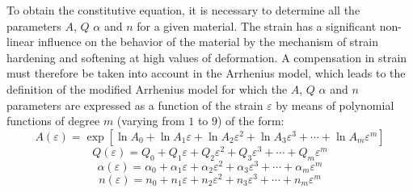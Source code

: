 \documentclass[twoside,english,1p,final,sort&compress]{elsarticle}
\theoremstyle{plain}
\begin{document}
To obtain the constitutive equation, it is necessary to determine all the parameters $A$, $Q$ $\alpha$ and $n$ for a given material.
The strain has a significant non-linear influence on the behavior of the material by the mechanism of strain hardening and softening at high values of deformation.
A compensation in strain must therefore be taken into account in the Arrhenius model, which leads to the definition of the modified Arrhenius model for which the $A$, $Q$ $\alpha$ and $n$ parameters are expressed as a function of the strain $\varepsilon$ by means of polynomial functions of degree $m$ (varying from $1$ to $9$) of the form:
\begin{equation}
A(\varepsilon) = \exp{\left[\ln\!A_0 + \ln\!A_1\varepsilon + \ln\!A_2\varepsilon^2 + \ln\!A_3\varepsilon^3 + \cdots + \ln\!A_m\varepsilon^m\right]}
\label{eq:ArA}
\end{equation}
\begin{equation}
Q(\varepsilon) = Q_0 + Q_1\varepsilon + Q_2\varepsilon^2 + Q_3\varepsilon^3 + \cdots + Q_m\varepsilon^m
\label{eq:ArQ}
\end{equation}
\begin{equation}
\alpha(\varepsilon) = \alpha_0 + \alpha_1\varepsilon + \alpha_2\varepsilon^2 + \alpha_3\varepsilon^3 + \cdots + \alpha_m\varepsilon^m
\label{eq:Aralpha}
\end{equation}
\begin{equation}
n(\varepsilon) = n_0 + n_1\varepsilon + n_2\varepsilon^2 + n_3\varepsilon^3 + \cdots + n_m\varepsilon^m
\label{eq:Arn}
\end{equation}
\end{document}
